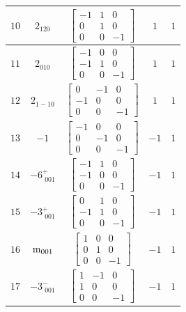 \documentclass[fleqn,8pt]{jsarticle}
\begin{document}
\begin{longtable}{ccccc}
$ 10 $ & $ 2{}_{120} $ & $ \begin{bmatrix} -1 & 1 & 0 \\ 0 & 1 & 0 \\ 0 & 0 & -1 \end{bmatrix} $ & $ 1 $ & $ 1 $ \\ \hline
$ 11 $ & $ 2{}_{010} $ & $ \begin{bmatrix} -1 & 0 & 0 \\ -1 & 1 & 0 \\ 0 & 0 & -1 \end{bmatrix} $ & $ 1 $ & $ 1 $ \\ \hline
$ 12 $ & $ 2{}_{1-10} $ & $ \begin{bmatrix} 0 & -1 & 0 \\ -1 & 0 & 0 \\ 0 & 0 & -1 \end{bmatrix} $ & $ 1 $ & $ 1 $ \\ \hline
$ 13 $ & $ -1 $ & $ \begin{bmatrix} -1 & 0 & 0 \\ 0 & -1 & 0 \\ 0 & 0 & -1 \end{bmatrix} $ & $ -1 $ & $ 1 $ \\ \hline
$ 14 $ & $ -6^{+}_{\,\,001} $ & $ \begin{bmatrix} -1 & 1 & 0 \\ -1 & 0 & 0 \\ 0 & 0 & -1 \end{bmatrix} $ & $ -1 $ & $ 1 $ \\ \hline
$ 15 $ & $ -3^{+}_{\,\,001} $ & $ \begin{bmatrix} 0 & 1 & 0 \\ -1 & 1 & 0 \\ 0 & 0 & -1 \end{bmatrix} $ & $ -1 $ & $ 1 $ \\ \hline
$ 16 $ & $ {\rm m}_{001} $ & $ \begin{bmatrix} 1 & 0 & 0 \\ 0 & 1 & 0 \\ 0 & 0 & -1 \end{bmatrix} $ & $ -1 $ & $ 1 $ \\ \hline
$ 17 $ & $ -3^{-}_{\,\,001} $ & $ \begin{bmatrix} 1 & -1 & 0 \\ 1 & 0 & 0 \\ 0 & 0 & -1 \end{bmatrix} $ & $ -1 $ & $ 1 $ \\ \hline

\end{longtable}
\end{document}
